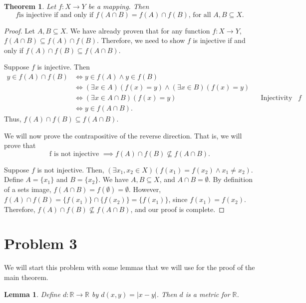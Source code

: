 \documentclass[12pt,a4paper]{article}
\theoremstyle{theorem}
\newtheorem{theorem}{Theorem}
\newtheorem{lemma}{Lemma}
\theoremstyle{definition}
\begin{document}
\begin{theorem}
Let $f:X \to Y$ be a mapping.  Then 
\begin{equation}
f \text{is injective if and only if } f(A \cap B) = f(A) \cap f(B) \text{,  for all } A,B \subseteq X.
\end{equation}
\end{theorem}

\begin{proof}
Let $A,B \subseteq X$.  We have already proven that for any function $f: X \to Y$,  $f(A \cap B) \subseteq f(A) \cap f(B)$.  Therefore,  we need to show $f$ is injective if and only if $f(A) \cap f(B) \subseteq f(A \cap B)$. 

Suppose $f$ is injective.  Then
\begin{align*}
y \in f(A) \cap f(B) &\iff y \in f(A) \land y \in f(B) && \\
&\iff (\exists x \in A)(f(x) = y) \land (\exists x \in B)(f(x) = y) &&\\
&\iff (\exists x \in A \cap B)(f(x) = y) && \text{Injectivity of } f \\
&\iff y \in f(A \cap B) \text{.}
\end{align*}
Thus,  $f(A) \cap f(B) \subseteq f(A \cap B)$. 

We will now prove the contrapositive of the reverse direction.  That is,  we will prove that 
\begin{equation} 
\text{f is not injective } \implies  f(A) \cap f(B) \not \subseteq f(A \cap B).
\end{equation}

Suppose $f$ is not injective. Then,  $(\exists x_1,  x_2 \in X)(f(x_1) = f(x_2) \land x_1 \not = x_2)$.  Define $A = \{x_1\}$ and $B = \{x_2\}$.  We have $A,B \subseteq X$,  and $A \cap B = \emptyset$.  By definition of  a sets image,  $f(A \cap B)= f(\emptyset) = \emptyset$. However,  $f(A) \cap f(B) = \{f(x_1) \} \cap \{f(x_2)\} = \{f(x_1) \}$,  since $f(x_1) = f(x_2)$.  Therefore,  $f(A) \cap f(B) \not \subseteq f(A \cap B)$,  and our proof is complete.
\end{proof}

\section*{Problem 3}
We will start this problem with some lemmas that we will use for the proof of the main theorem.

\begin{lemma}
Define $d: \mathbb{R} \to \mathbb{R}$ by $d(x,  y) = |x - y|$.  Then $d$ is a metric for $\mathbb{R}$.
\end{lemma}
\end{document}
